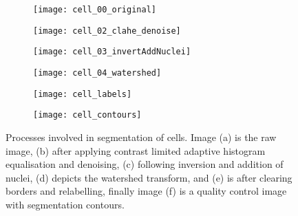 \begin{figure}[htbp]\centering
	\begin{subfigure}[b]{0.45\linewidth} %
		\centering
		\texttt{[image: cell\_00\_original]}
		\caption{}
		\label{figure:image_processing:cell_segmentation:original}
		\vspace{1ex}
	\end{subfigure}
	\begin{subfigure}[b]{0.45\linewidth} %
		\centering
		\texttt{[image: cell\_02\_clahe\_denoise]}
		\caption{}
		\label{figure:image_processing:cell_segmentation:clahe_denoise}
		\vspace{1ex}
	\end{subfigure}
	\begin{subfigure}[b]{0.45\linewidth} %
		\centering
		\texttt{[image: cell\_03\_invertAddNuclei]}
		\caption{}
		\label{figure:image_processing:cell_segmentation:invertAddNuclei}
		\vspace{1ex}
	\end{subfigure}
	\begin{subfigure}[b]{0.45\linewidth} %
		\centering
		\texttt{[image: cell\_04\_watershed]}
		\caption{}
		\label{figure:image_processing:cell_segmentation:watershed}
		\vspace{1ex}
	\end{subfigure}
	\begin{subfigure}[b]{0.45\linewidth} %
		\centering
		\texttt{[image: cell\_labels]}
		\caption{}
		\label{figure:image_processing:cell_segmentation:cell_labels}
		\vspace{1ex}
	\end{subfigure}
	\begin{subfigure}[b]{0.45\linewidth} %
		\centering
		\texttt{[image: cell\_contours]}
		\caption{}
		\label{figure:image_processing:cell_segmentation:contours}
		\vspace{1ex}
	\end{subfigure}
	\vspace{-1ex}
\caption[Cell segmentation]{Processes involved in segmentation of cells. Image (a) is the raw image, (b) after applying contrast limited adaptive histogram equalisation and denoising, (c) following inversion and addition of nuclei, (d) depicts the watershed transform, and (e) is after clearing borders and relabelling, finally image (f) is a quality control image with segmentation contours.}
\label{figure:image_processing:cell_segmentation}
\end{figure}

